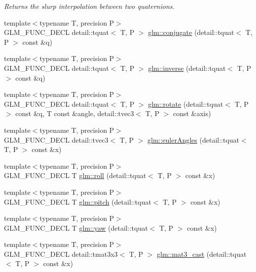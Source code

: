 \begin{CompactItemize}
\begin{CompactList}\small\item\em Returns the slurp interpolation between two quaternions. \item\end{CompactList}\item 
{\footnotesize template$<$typename T, precision P$>$ }\\GLM\_\-FUNC\_\-DECL detail::tquat$<$ T, P $>$ \hyperlink{group__gtc__quaternion_gdbb01a11c8e4f4e0602f6cc649896066}{glm::conjugate} (detail::tquat$<$ T, P $>$ const \&q)
\item 
{\footnotesize template$<$typename T, precision P$>$ }\\GLM\_\-FUNC\_\-DECL detail::tquat$<$ T, P $>$ \hyperlink{group__gtc__quaternion_g105dc7d1f84cc6cf4ba6e3634c671688}{glm::inverse} (detail::tquat$<$ T, P $>$ const \&q)
\item 
{\footnotesize template$<$typename T, precision P$>$ }\\GLM\_\-FUNC\_\-DECL detail::tquat$<$ T, P $>$ \hyperlink{group__gtc__quaternion_gca43bc964b553c2bde6a60499c1f2b50}{glm::rotate} (detail::tquat$<$ T, P $>$ const \&q, T const \&angle, detail::tvec3$<$ T, P $>$ const \&axis)
\item 
{\footnotesize template$<$typename T, precision P$>$ }\\GLM\_\-FUNC\_\-DECL detail::tvec3$<$ T, P $>$ \hyperlink{group__gtc__quaternion_gb7f90472a816598e7bc7b3606dbadcac}{glm::eulerAngles} (detail::tquat$<$ T, P $>$ const \&x)
\item 
{\footnotesize template$<$typename T, precision P$>$ }\\GLM\_\-FUNC\_\-DECL T \hyperlink{group__gtc__quaternion_g3f58a75c69ff56cb9c83ea237abc1414}{glm::roll} (detail::tquat$<$ T, P $>$ const \&x)
\item 
{\footnotesize template$<$typename T, precision P$>$ }\\GLM\_\-FUNC\_\-DECL T \hyperlink{group__gtc__quaternion_g091250a9d0674463c4c9342563184bcd}{glm::pitch} (detail::tquat$<$ T, P $>$ const \&x)
\item 
{\footnotesize template$<$typename T, precision P$>$ }\\GLM\_\-FUNC\_\-DECL T \hyperlink{group__gtc__quaternion_g36e24dea9793778d8b1093daed17eba1}{glm::yaw} (detail::tquat$<$ T, P $>$ const \&x)
\item 
{\footnotesize template$<$typename T, precision P$>$ }\\GLM\_\-FUNC\_\-DECL detail::tmat3x3$<$ T, P $>$ \hyperlink{group__gtc__quaternion_gbbfeeb474bc34d9c73cfdc8af78cfb8b}{glm::mat3\_\-cast} (detail::tquat$<$ T, P $>$ const \&x)

\end{CompactItemize}
